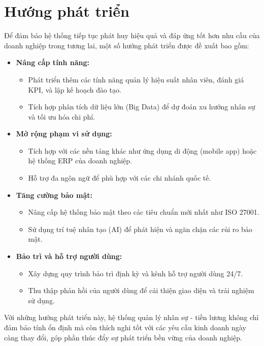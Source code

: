\section*{Hướng phát triển}
Để đảm bảo hệ thống tiếp tục phát huy hiệu quả và đáp ứng tốt hơn nhu cầu của doanh nghiệp trong tương lai, một số hướng phát triển được đề xuất bao gồm:
\begin{itemize}
    \item \textbf{Nâng cấp tính năng:}
          \begin{itemize}
              \item Phát triển thêm các tính năng quản lý hiệu suất nhân viên, đánh giá KPI, và lập kế hoạch đào tạo.
              \item Tích hợp phân tích dữ liệu lớn (Big Data) để dự đoán xu hướng nhân sự và tối ưu hóa chi phí.
          \end{itemize}
    \item \textbf{Mở rộng phạm vi sử dụng:}
          \begin{itemize}
              \item Tích hợp với các nền tảng khác như ứng dụng di động (mobile app) hoặc hệ thống ERP của doanh nghiệp.
              \item Hỗ trợ đa ngôn ngữ để phù hợp với các chi nhánh quốc tế.
          \end{itemize}
    \item \textbf{Tăng cường bảo mật:}
          \begin{itemize}
              \item Nâng cấp hệ thống bảo mật theo các tiêu chuẩn mới nhất như ISO 27001.
              \item Sử dụng trí tuệ nhân tạo (AI) để phát hiện và ngăn chặn các rủi ro bảo mật.
          \end{itemize}
    \item \textbf{Bảo trì và hỗ trợ người dùng:}
          \begin{itemize}
              \item Xây dựng quy trình bảo trì định kỳ và kênh hỗ trợ người dùng 24/7.
              \item Thu thập phản hồi của người dùng để cải thiện giao diện và trải nghiệm sử dụng.
          \end{itemize}
\end{itemize}
Với những hướng phát triển này, hệ thống quản lý nhân sự - tiền lương không chỉ đảm bảo tính ổn định mà còn thích nghi tốt với các yêu cầu kinh doanh ngày càng thay đổi, góp phần thúc đẩy sự phát triển bền vững của doanh nghiệp.
